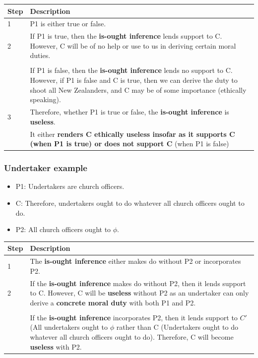 \documentclass[11pt]{article}
\begin{document}
\begin{center}
\begin{tabular}{|m{5em}|m{25em}|}
\hline
Step & Description\\
\hline
1 & P1 is either true or false.\\
\hline
2 & If P1 is true, then the \textbf{is-ought inference} lends support to C. However, C will be of no help or use to us in deriving certain moral duties.\\
 & \\
 & If P1 is false, then the \textbf{is-ought inference} lends no support to C. However, if P1 is false and C is true, then we can derive the duty to shoot all New Zealanders, and C may be of some importance (ethically speaking).\\
\hline
3 & Therefore, whether P1 is true or false, the \textbf{is-ought inference} is \textbf{useless}.\\
 & It either \textbf{renders C ethically useless insofar as it supports C (when P1 is true) or does not support C} (when P1 is false)\\
\hline
\end{tabular}
\end{center}
 \newpage
\subsubsection{Undertaker example}
\label{sec:org24315b4}
\begin{itemize}
\item P1: Undertakers are church officers.
\item C: Therefore, undertakers ought to do whatever all church officers ought to do.
\item P2: All church officers ought to \(\phi\).
\end{itemize}

\begin{center}
\begin{tabular}{|m{5em}|m{25em}|}
\hline
Step & Description\\
\hline
1 & The \textbf{is-ought inference} either makes do without P2 or incorporates P2.\\
\hline
2 & If the \textbf{is-ought inference} makes do without P2, then it lends support to C. However, C will be \textbf{useless} without P2 as an undertaker can only derive a \textbf{concrete moral duty} with both P1 and P2.\\
 & \\
 & If the \textbf{is-ought inference} incorporates P2, then it lends support to \(C'\) (All undertakers ought to \(\phi\) rather than C (Undertakers ought to do whatever all church officers ought to do). Therefore, C will become \textbf{useless} with P2.\\
\hline
\end{tabular}
\end{center}
\end{document}
